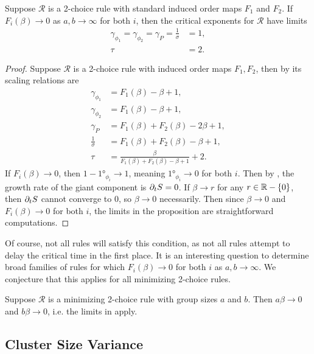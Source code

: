 \documentclass[twoside,10pt]{article}
\begin{document}
\begin{prop}
	\label{2c-limits}
	Suppose $\mathcal{R}$ is a 2-choice rule with standard induced order maps $F_1$ and $F_2$. If $F_i(\beta)\to 0$ as $a,b\to \infty$ for both $i$, then the critical exponents for $\mathcal{R}$ have limits
	\begin{align*}
		\gamma_{\phi_1} = \gamma_{\phi_2} = \gamma_{P} = \frac{1}{\sigma} &= 1,\\
		\tau &= 2.
	\end{align*}
\end{prop}
\begin{proof}
	Suppose $\mathcal{R}$ is a 2-choice rule with induced order maps $F_1, F_2$, then by  its scaling relations are
\begin{align*}
	\gamma_{\phi_1} &= F_1(\beta)-\beta+1,\\
	\gamma_{\phi_2} &= F_1(\beta)-\beta+1,\\
	\gamma_{P} &= F_1(\beta)+F_2(\beta)-2\beta+1,\\
	\frac{1}{\sigma} &= F_1(\beta)+F_2(\beta)-\beta+1,\\
	\tau &= \frac{\beta}{F_1(\beta)+F_2(\beta)-\beta+1} +2.
\end{align*}
If $F_{i}(\beta)\to 0$, then $1 - \ang{1}_{\phi_i} \to 1$, meaning $\ang{1}_{\phi_i}\to 0$ for both $i$. Then by , the growth rate of the giant component is $\partial_{t}{} S = 0$. If $\beta \to r$ for any $r \in \mathbb{R} - \left\{ 0 \right\}$, then $\partial_{t}{} S$ cannot converge to $0$, so $\beta \to 0$ necessarily. Then since $\beta \to 0$ and $F_{i}(\beta)\to 0$ for both $i$, the limits in the proposition are straightforward computations.
\end{proof}

Of course, not all rules will satisfy this condition, as not all rules attempt to delay the critical time in the first place. It is an interesting question to determine broad families of rules for which $F_{i}(\beta)\to 0$ for both $i$ as $a,b \to \infty$. We conjecture that this applies for all minimizing 2-choice rules.

\begin{conj}
	\label{m-beta-0}
        Suppose $\mathcal{R}$ is a minimizing 2-choice rule with group sizes $a$ and $b$. Then $a\beta \to 0$ and $b\beta\to 0$, i.e. the limits in  apply.
\end{conj}

\subsection{Cluster Size Variance}
\end{document}

